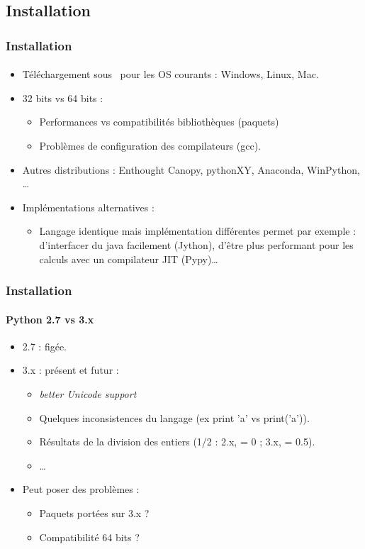 \subsection{Installation}
\begin{frame}
\frametitle{Installation}
\framesubtitle{}
\begin{itemize}
 \item Téléchargement sous \urlPython\ pour les OS courants : Windows, Linux, Mac. 
 \item 32 bits vs 64 bits : 
  \begin{itemize}
   \small
   \item Performances vs compatibilités bibliothèques (paquets) 
   \item Problèmes de configuration des compilateurs (gcc).
  \end{itemize}
 \item Autres distributions : Enthought Canopy, pythonXY, Anaconda, WinPython, \dots 
 \item Implémentations alternatives : 
 \begin{itemize}
  \small
  \item Langage identique mais implémentation différentes permet par exemple : d'interfacer du java facilement (Jython), d'être plus performant pour les calculs avec un compilateur JIT (Pypy)\dots
 \end{itemize}
\end{itemize}
\end{frame}
\begin{frame}
\frametitle{Installation}
\framesubtitle{Python 2.7 vs 3.x}

\begin{itemize}
\item 2.7 : figée.
\item 3.x : présent et futur : 
\begin{itemize}
 \item {\it better Unicode support}
 \item Quelques inconsistences du langage (ex print 'a' vs print('a')).  
 \item Résultats de la division des entiers (1/2 : 2.x, = 0 ; 3.x, = 0.5). 
 \item \dots
\end{itemize}
\item Peut poser des problèmes :
\begin{itemize}
 \item Paquets portées sur 3.x ?
 \item Compatibilité 64 bits ? 
\end{itemize}
\end{itemize}
\end{frame}

